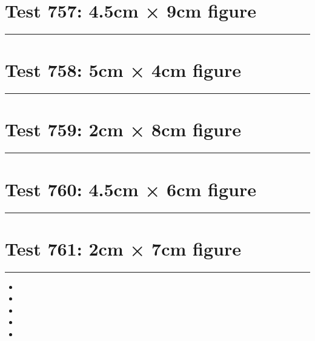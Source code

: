 \documentclass[a4paper,11pt]{article}
\begin{document}
\section*{Test 757: 4.5cm × 9cm figure}
\begin{swarmwrap}%
  \begin{minipage}[t]{4cm}
    \centering
    \rule{\linewidth}{9cm}
  \end{minipage}%
\end{swarmwrap}%
\swarmwrapnext
\lipsum[33]
\lipsum[34]
\lipsum[35]
\section*{Test 758: 5cm × 4cm figure}
\begin{swarmwrap}%
  \begin{minipage}[t]{5cm}
    \centering
    \rule{\linewidth}{4cm}
  \end{minipage}%
\end{swarmwrap}%
\swarmwrapnext
\lipsum[118]
\lipsum[119]
\lipsum[120]
\lipsum[121]
\lipsum[122]
\lipsum[123]
\section*{Test 759: 2cm × 8cm figure}
\begin{swarmwrap}%
  \begin{minipage}[t]{2cm}
    \centering
    \rule{\linewidth}{8cm}
  \end{minipage}%
\end{swarmwrap}%
\swarmwrapnext
\lipsum[35]
\lipsum[36]
\lipsum[37]
\lipsum[38]
\section*{Test 760: 4.5cm × 6cm figure}
\begin{swarmwrap}%
  \begin{minipage}[t]{4cm}
    \centering
    \rule{\linewidth}{6cm}
  \end{minipage}%
\end{swarmwrap}%
\swarmwrapnext
\lipsum[72]
\lipsum[73]
\lipsum[74]
\lipsum[75]
\section*{Test 761: 2cm × 7cm figure}
\begin{swarmwrap}%
  \begin{minipage}[t]{2cm}
    \centering
    \rule{\linewidth}{7cm}
  \end{minipage}%
\end{swarmwrap}%
\swarmwrapnext
\lipsum[22]
\begin{itemize}
  \item \lipsum[23][1-3]
  \item \lipsum[24][1-3]
  \item \lipsum[25][1-3]
  \item \lipsum[26][1-3]
  \item \lipsum[27][1-3]
\end{itemize}
\end{document}
